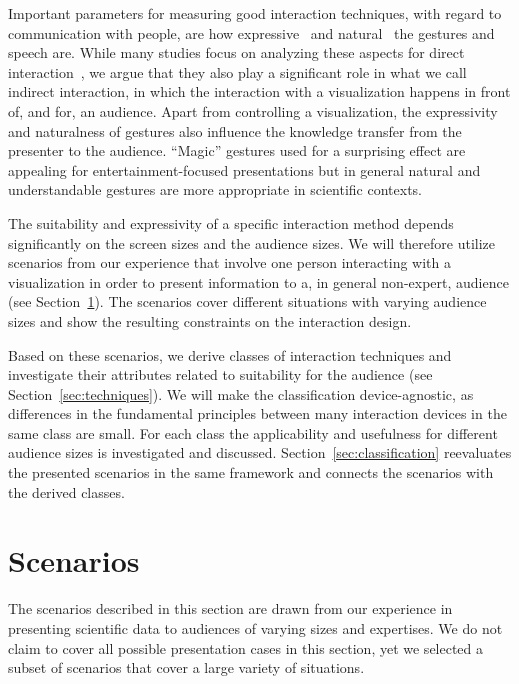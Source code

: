 \documentclass[review,journal]{vgtc}         %
\begin{document}
Important parameters for measuring good interaction techniques, with regard to communication with people, are how expressive~\cite{Brewster:2009:MIE:2227763.2227769} and natural~\cite{O'hara:2013:NTP:2442106.2442111} the gestures and speech are.
While many studies focus on analyzing these aspects for direct interaction~\cite{978-3-642-12552-2, Caridakis:2013:NIE:2504335.2504378}, we argue that they also play a significant role in what we call indirect interaction, in which the interaction with a visualization happens in front of, and for, an audience.
Apart from controlling a visualization, the expressivity and naturalness of gestures also influence the knowledge transfer from the presenter to the audience.
``Magic'' gestures used for a surprising effect are appealing for entertainment-focused presentations but in general natural and understandable gestures are more appropriate in scientific contexts.

The suitability and expressivity of a specific interaction method depends significantly on the screen sizes and the audience sizes.
We will therefore utilize scenarios from our experience that involve one person interacting with a visualization in order to present information to a, in general non-expert, audience (see Section~\ref{sec:scenario}).
The scenarios cover different situations with varying audience sizes and show the resulting constraints on the interaction design.

Based on these scenarios, we derive classes of interaction techniques and investigate their attributes related to suitability for the audience (see Section~\ref{sec:techniques}).
We will make the classification device-agnostic, as differences in the fundamental principles between many interaction devices in the same class are small.
For each class the applicability and usefulness for different audience sizes is investigated and discussed.
Section~\ref{sec:classification} reevaluates the presented scenarios in the same framework and connects the scenarios with the derived classes.

%
%
%
\section{Scenarios} \label{sec:scenario}
The scenarios described in this section are drawn from our experience in presenting scientific data to audiences of varying sizes and expertises.
We do not claim to cover all possible presentation cases in this section, yet we selected a subset of scenarios that cover a large variety of situations.
\end{document}
